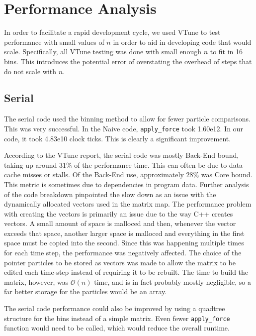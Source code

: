 \documentclass{article}
\begin{document}

\section{Performance Analysis}\label{section:vtune}
In order to facilitate a rapid development cycle, we used VTune to test
performance with small values of $n$ in order to aid in developing code that
would scale. Specifically, all VTune testing was done with small enough $n$ to
fit in 16 bins. This introduces the potential error of overstating the overhead
of steps that do not scale with $n$.
\subsection{Serial}
The serial code used the binning method to allow for fewer particle comparisons.
This was very successful. In the Naive code, \texttt{apply\_force} took 1.60e12.
In our code, it took 4.83e10 clock ticks. This is clearly a significant
improvement.

According to the VTune report, the serial code was mostly Back-End bound, taking
up around 31\% of the performance time. This can often be due to data-cache
misses or stalls. Of the Back-End use, approximately 28\% was Core bound. This
metric is sometimes due to dependencies in program data. Further analysis of the
code breakdown pinpointed the slow down as an issue with the dynamically
allocated vectors used in the matrix map. The performance problem with creating
the vectors is primarily an issue due to the way C++ creates vectors. A small
amount of space is malloced and then, whenever the vector exceeds that space,
another larger space is malloced and everything in the first space must be
copied into the second. Since this was happening multiple times for each time
step, the performance was negatively affected. The choice of the pointer
particles to be stored as vectors was made to allow the matrix to be edited each
time-step instead of requiring it to be rebuilt. The time to build the matrix,
however, was $\mathcal{O}(n)$ time, and is in fact probably mostly negligible,
so a far better storage for the particles would be an array.

The serial code performance could also be improved by using a quadtree structure
for the bins instead of a simple matrix. Even fewer \texttt{apply\_force}
function would need to be called, which would reduce the overall runtime.
\end{document}
